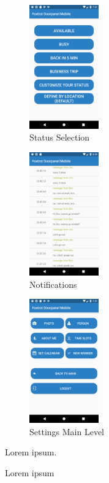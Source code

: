\documentclass[article,colorback,accentcolor=tud4c, 11pt]{tudreport}
\begin{document}
	\begin{figure}
		\centering
		\includegraphics[width=30mm,scale=0.8]{mobile/Status-selection.png}
		\caption{Status Selection}
	\end{figure}

	\begin{figure}
		\centering
		\includegraphics[width=30mm,scale=0.8]{mobile/Notifications.png}
		\caption{Notifications}
	\end{figure}

	\begin{figure}
		\centering
		\includegraphics[width=30mm,scale=0.8]{mobile/Settings.png}
		\caption{Settings Main Level}
	\end{figure}	

	Lorem ipsum.%
	
	Lorem ipsum
	
	
	\listoffigures{}
\end{document}
